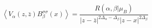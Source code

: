 \begin{equation}
\left\langle
V_{\alpha}(z,\bar{z})B_{\beta}^{\sigma\sigma}(x)\right\rangle
=\frac{R(\alpha,\beta |\mu_{B})}{\left|  z-\bar{z}\right|
^{2\Delta_{\alpha}-\Delta_{\beta}}\left| z-x\right|
^{2\Delta_{\beta}}} \label{bbound} \nonumber
\end{equation}

